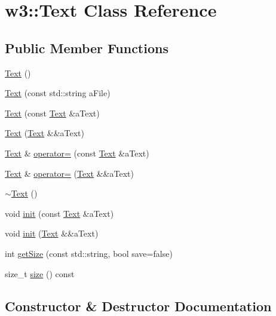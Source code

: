 \hypertarget{classw3_1_1Text}{}\section{w3\+:\+:Text Class Reference}
\label{classw3_1_1Text}
\subsection*{Public Member Functions}
\begin{DoxyCompactItemize}
\item 
\mbox{\hyperlink{classw3_1_1Text_a246f1f28a131ed236fe0855ee52675c8}{Text}} ()
\item 
\mbox{\hyperlink{classw3_1_1Text_aa81c2b7009d35ff78c0e0937093ef7fd}{Text}} (const std\+::string a\+File)
\item 
\mbox{\hyperlink{classw3_1_1Text_a31ae34f225b1ba9996030fb9654b1c99}{Text}} (const \mbox{\hyperlink{classw3_1_1Text}{Text}} \&a\+Text)
\item 
\mbox{\hyperlink{classw3_1_1Text_a87c28dfc63a709ead728be4a6d3308b4}{Text}} (\mbox{\hyperlink{classw3_1_1Text}{Text}} \&\&a\+Text)
\item 
\mbox{\hyperlink{classw3_1_1Text}{Text}} \& \mbox{\hyperlink{classw3_1_1Text_afedee168a1c51e33ff7ee514c4e644eb}{operator=}} (const \mbox{\hyperlink{classw3_1_1Text}{Text}} \&a\+Text)
\item 
\mbox{\hyperlink{classw3_1_1Text}{Text}} \& \mbox{\hyperlink{classw3_1_1Text_a0cdbe0667f1d75b600276ec718ab2520}{operator=}} (\mbox{\hyperlink{classw3_1_1Text}{Text}} \&\&a\+Text)
\item 
\mbox{\hyperlink{classw3_1_1Text_a599c6614ba05c4cbd3ef9b8968a73ad4}{$\sim$\+Text}} ()
\item 
void \mbox{\hyperlink{classw3_1_1Text_a0e6babcf3bf4a249883e9930964f1341}{init}} (const \mbox{\hyperlink{classw3_1_1Text}{Text}} \&a\+Text)
\item 
void \mbox{\hyperlink{classw3_1_1Text_a9e64abcee5332f985714f735f603a249}{init}} (\mbox{\hyperlink{classw3_1_1Text}{Text}} \&\&a\+Text)
\item 
int \mbox{\hyperlink{classw3_1_1Text_a2545c8cbf902b0addb4ba509872ce6a9}{get\+Size}} (const std\+::string, bool save=false)
\item 
size\+\_\+t \mbox{\hyperlink{classw3_1_1Text_aa738305950f5a5def3c56b98dcc5e14a}{size}} () const
\end{DoxyCompactItemize}


\subsection{Constructor \& Destructor Documentation}
\mbox{\label{classw3_1_1Text_a246f1f28a131ed236fe0855ee52675c8}} 
